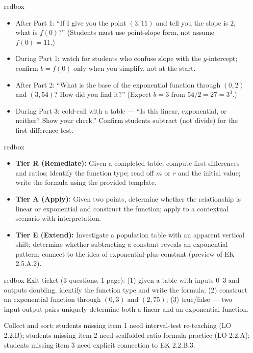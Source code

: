 \documentclass[10pt]{article}
\begin{document}
\begin{skillbox}{redbox}
\begin{itemize}[leftmargin=1.2em,itemsep=2pt,topsep=0pt]
  \item After Part 1: ``If I give you the point $(3, 11)$ and tell you the slope is $2$, what is
        $f(0)$?'' (Students must use point-slope form, not assume $f(0) = 11$.)
  \item During Part 1: watch for students who confuse slope with the $y$-intercept; confirm
        $b = f(0)$ only when you simplify, not at the start.
  \item After Part 2: ``What is the base of the exponential function through $(0,2)$ and $(3,54)$?
        How did you find it?'' (Expect $b = 3$ from $54/2 = 27 = 3^3$.)
  \item During Part 3: cold-call with a table — ``Is this linear, exponential, or neither? Show
        your check.'' Confirm students subtract (not divide) for the first-difference test.
\end{itemize}
\end{skillbox}

\begin{skillbox}{redbox}
\begin{itemize}[leftmargin=1.2em,itemsep=2pt,topsep=0pt]
  \item \textbf{Tier R (Remediate):} Given a completed table, compute first differences and
        ratios; identify the function type; read off $m$ or $r$ and the initial value; write the
        formula using the provided template.
  \item \textbf{Tier A (Apply):} Given two points, determine whether the relationship is linear or
        exponential and construct the function; apply to a contextual scenario with interpretation.
  \item \textbf{Tier E (Extend):} Investigate a population table with an apparent vertical shift;
        determine whether subtracting a constant reveals an exponential pattern; connect to the
        idea of exponential-plus-constant (preview of EK 2.5.A.2).
\end{itemize}
\end{skillbox}

\begin{skillbox}{redbox}
Exit ticket (3 questions, 1 page): (1) given a table with inputs 0--3 and outputs doubling,
identify the function type and write the formula; (2) construct an exponential function through
$(0,3)$ and $(2,75)$; (3) true/false --- two input-output pairs uniquely determine both a
linear and an exponential function.

Collect and sort: students missing item 1 need interval-test re-teaching (LO 2.2.B);
students missing item 2 need scaffolded ratio-formula practice (LO 2.2.A); students missing
item 3 need explicit connection to EK 2.2.B.3.
\end{skillbox}
\end{document}
